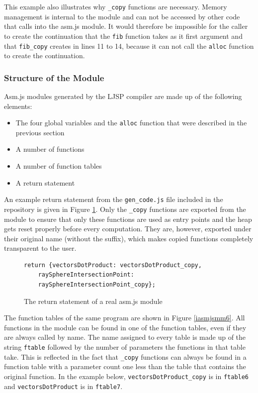\documentclass[11pt]{report}
\begin{document}
This example also illustrates why \texttt{_copy} functions are necessary. Memory management is internal to the module and can not be accessed by other code that calls into the asm.js module. It would therefore be impossible for the caller to create the continuation that the \texttt{fib} function takes as it first argument and that \texttt{fib_copy} creates in lines 11 to 14, because it can not call the \texttt{alloc} function to create the continuation.

\subsubsection{Structure of the Module}

Asm.js modules generated by the LJSP compiler are made up of the following elements:
\begin{itemize}
\item The four global variables and the \texttt{alloc} function that were described in the previous section
\item A number of functions
\item A number of function tables
\item A return statement
\end{itemize}

An example return statement from the \texttt{gen_code.js} file included in the repository is given in Figure \ref{iasmjsmm5}. Only the \texttt{_copy} functions are exported from the module to ensure that only these functions are used as entry points and the heap gets reset properly before every computation. They are, however, exported under their original name (without the suffix), which makes copied functions completely transparent to the user.

\begin{figure}[ht]
\begin{lstlisting}
return {vectorsDotProduct: vectorsDotProduct_copy, 
    raySphereIntersectionPoint: 
    raySphereIntersectionPoint_copy};
\end{lstlisting}
\caption{The return statement of a real asm.js module}
\label{iasmjsmm5}
\end{figure}

The function tables of the same program are shown in Figure \ref{iasmjsmm6}. All functions in the module can be found in one of the function tables, even if they are always called by name. The name assigned to every table is made up of the string \texttt{ftable} followed by the number of parameters the functions in that table take. This is reflected in the fact that \texttt{_copy} functions can always be found in a function table with a parameter count one less than the table that contains the original function. In the example below, \texttt{vectorsDotProduct_copy} is in \texttt{ftable6} and \texttt{vectorsDotProduct} is in \texttt{ftable7}.
\end{document}
